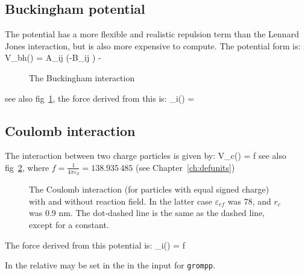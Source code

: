 \subsection{Buckingham potential}
The  
potential has a more flexible and realistic repulsion term
than the Lennard Jones interaction, but is also more expensive to
compute. The potential form is:
\beq
V_{bh}(\rij) = A_{ij} \exp(-B_{ij} \rij) -
\eeq
\begin {figure}
\centerline{}
\caption {The Buckingham interaction}
\label{fig:bham}
\end {figure}

see also fig~\ref{fig:bham}, the force derived from this is:
\beq
 _i(\rij) =  \rnorm
\eeq

\subsection{Coulomb interaction}
\label{sec:coul}
\newcommand{\epsr}{\varepsilon_r}
\newcommand{\epsrf}{\varepsilon_{rf}}
The  interaction between two charge particles is given by:
\beq
V_c(\rij) = f \frac{q_i q_j}{\epsr \rij}
\label{eqn:vcoul}
\eeq
see also fig~\ref{fig:coul}, where $f = \frac{1}{4\pi \varepsilon_0} =
138.935\,485$ (see Chapter~\ref{ch:defunits})
\begin {figure}
\centerline{}
\caption[The Coulomb interaction (for particles with equal signed
charge) with and without reaction field.]{The Coulomb interaction (for
particles with equal signed charge) with and without reaction
field. In the latter case $\epsrf$ was 78, and $r_c$ was 0.9 nm. The
dot-dashed line is the same as the dashed line, except for a
constant.}
\label{fig:coul}
\end {figure}

The force derived from this potential is:
\beq
{}_i(\rvij) = f \frac{q_i q_j}{\epsr\rij^2}\rnorm
\eeq

In {\gromacs} the  relative  
\normindex{$\epsr$}
may be set in the in the input for {\tt grompp}. 

